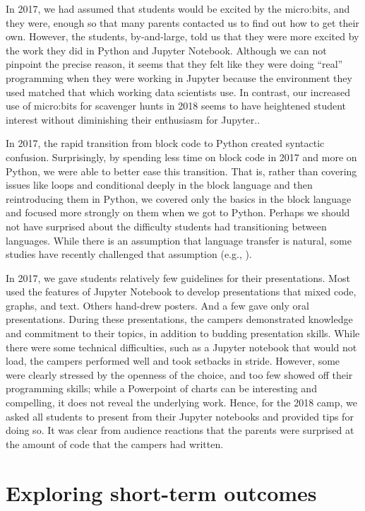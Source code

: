 In 2017, we had assumed that students would be excited by the
micro:bits, and they were, enough so that many parents contacted
us to find out how to get their own.  However, the students,
by-and-large, told us that they were more excited by the work they
did in Python and Jupyter Notebook.  Although we can not pinpoint
the precise reason, it seems that they felt like they were doing
``real'' programming when they were working in Jupyter because the
environment they used matched that which working data scientists
use.  In contrast, our increased use of micro:bits for scavenger
hunts in 2018 seems to have heightened student interest without
diminishing their enthusiasm for Jupyter..

In 2017, the rapid transition from block code to Python created
syntactic confusion.  Surprisingly, by spending less time on block
code in 2017 and more on Python, we were able to better ease this
transition.  That is, rather than covering issues like loops and
conditional deeply in the block language and then reintroducing
them in Python, we covered only the basics in the block language
and focused more strongly on them when we got to Python.  Perhaps
we should not have surprised about the difficulty students had
transitioning between languages.  While there is an assumption that
language transfer is natural, some studies have recently challenged
that assumption (e.g., \cite{Chetty2012,Dann2012}).

In 2017, we gave students relatively few guidelines for their
presentations.  Most used the features of Jupyter Notebook to develop
presentations that mixed code, graphs, and text.  Others hand-drew
posters.  And a few gave only oral presentations.  During these
presentations, the campers demonstrated knowledge and commitment
to their topics, in addition to budding presentation skills. While
there were some technical difficulties, such as a Jupyter notebook
that would not load, the campers performed well and took setbacks
in stride.  However, some were clearly stressed by the openness of
the choice, and too few showed off their programming skills; while
a Powerpoint of charts can be interesting and compelling, it does
not reveal the underlying work.  Hence, for the 2018 camp, we asked
all students to present from their Jupyter notebooks and provided
tips for doing so.  It was clear from audience reactions that the
parents were surprised at the amount of code that the campers had
written.

\section{Exploring short-term outcomes}

